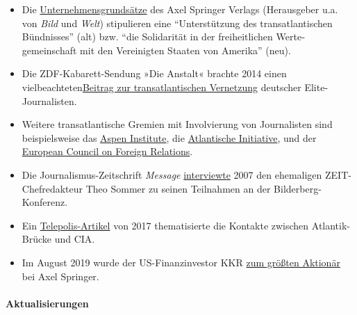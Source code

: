 \begin{itemize}
\tightlist
\item
  Die
  \href{https://bildblog.de/89290/axel-springer-gibt-sich-neue-alte-grundsaetze/}{Unternehmensgrundsätze}
  des Axel Springer Verlags (Herausgeber u.a. von \emph{Bild} und
  \emph{Welt}) stipulieren eine ``Unterstützung des trans­atlantischen
  Bündnisses'' (alt) bzw. ``die Solidarität in der freiheitlichen
  Werte­gemeinschaft mit den Vereinigten Staaten von Amerika'' (neu).
\item
  Die ZDF-Kabarett-Sendung »Die Anstalt« brachte 2014 einen
  vielbeachteten\href{https://swprs.org/zdf-anstalt-transatlantische-medien-netzwerke/}{Beitrag
  zur transatlantischen Vernetzung} deutscher Elite-Journalisten.
\item
  Weitere transatlantische Gremien mit Involvierung von Journalisten
  sind beispielsweise das
  \href{https://de.wikipedia.org/wiki/Aspen_Institute}{Aspen Institute},
  die
  \href{https://de.wikipedia.org/wiki/Atlantische_Initiative}{Atlantische
  Initiative}, und der
  \href{https://de.wikipedia.org/wiki/European_Council_on_Foreign_Relations}{European
  Council on Foreign Relations}.
\item
  Die Journalismus-Zeitschrift \emph{Message}
  \href{https://www.lobbycontrol.de/download/Message_Bilderberg.pdf}{interviewte}
  2007 den ehemaligen ZEIT-Chefredakteur Theo Sommer zu seinen
  Teilnahmen an der Bilderberg-Konferenz.
\item
  Ein
  \href{https://www.heise.de/tp/features/Jan-Fleischhauer-die-Atlantik-Bruecke-und-die-CIA-3838580.html?seite=all}{Telepolis-Artikel}
  von 2017 thematisierte die Kontakte zwischen Atlantik-Brücke und CIA.
\item
  Im August 2019 wurde der US-Finanzinvestor KKR
  \href{https://www.reuters.com/article/us-axel-sprngr-m-a-idUSKCN1VG1DK}{zum
  größten Aktionär} bei Axel Springer.
\end{itemize}

\hypertarget{aktualisierungen}{%
\paragraph{Aktualisierungen}\label{aktualisierungen}}

